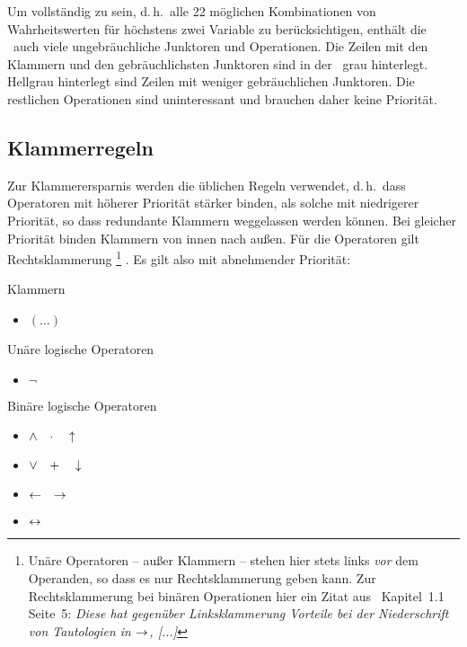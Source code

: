 \documentclass[english,ngerman,parskip=half,headsepline,footsepline]{scrreprt}
\makeatletter
\newcommand*{\textdh}{d.\@\,h.\@}
\newcommand*{\clq}{'}%
\newcommand*{\crq}{'}%
\newcommand*{\clqt}{}%
\newcommand*{\crqt}{}%
\makeatother
\begin{document}
	Um vollständig zu sein, \textdh\ alle 22 möglichen Kombinationen von Wahrheitswerten für höchstens zwei Variable zu berücksichtigen, enthält die \tablename\ auch viele ungebräuchliche Junktoren und Operationen.
	Die Zeilen mit den Klammern und den gebräuchlichsten Junktoren sind in der \tablename\ grau hinterlegt.
	Hellgrau hinterlegt sind Zeilen mit weniger gebräuchlichen Junktoren.
	Die restlichen Operationen sind uninteressant und brauchen daher keine Priorität.

	\subsection{Klammerregeln}%
	\label{sub:Klammerregeln}

	Zur Klammerersparnis werden die üblichen Regeln verwendet, \textdh\ dass Operatoren mit höherer Priorität stärker binden, als solche mit niedrigerer Priorität, so dass redundante Klammern weggelassen werden können.
	Bei gleicher Priorität binden Klammern von innen nach außen.
	Für die Operatoren gilt Rechtsklammerung%
	\footnote{%
		Unäre Operatoren -- außer Klammern -- stehen hier stets links \emph{vor} dem Operanden, so dass es nur Rechtsklammerung geben kann.
		Zur Rechtsklammerung bei binären Operationen hier ein Zitat aus~\cite{bib:Rautenberg} Kapitel~1.1 Seite~5: \emph{Diese hat gegenüber Linksklammerung Vorteile bei der Niederschrift von Tautologien in $\rightarrow$, [...]}
	}%
	.
	Es gilt also mit abnehmender Priorität:

	Klammern
	\begin{itemize}
		\item \clqt$(\dots)$\crqt
	\end{itemize}

	Unäre logische Operatoren
	\begin{itemize}
		\item \clqt$\lnot$\crqt
	\end{itemize}

	Binäre logische Operatoren
	\begin{itemize}
		\item $\land\quad\cdot\quad\uparrow$
		\item $\lor\quad+\quad\downarrow$
		\item $\leftarrow\quad\rightarrow$
		\item $\leftrightarrow$
	\end{itemize}
\end{document}
